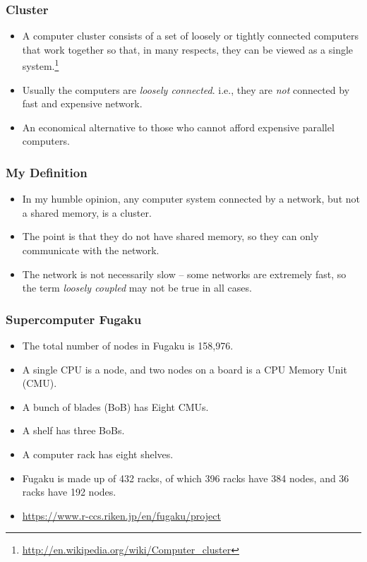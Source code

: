 \documentclass{beamer}
\begin{document}
\begin{CJK}{UTF8}{bsmi}
  \begin{frame}
    \frametitle{Cluster}
    \begin{itemize}
    \item A computer cluster consists of a set of loosely or tightly
      connected computers that work together so that, in many respects,
      they can be viewed as a single
      system.\footnote{\url{http://en.wikipedia.org/wiki/Computer_cluster}}
    \item Usually the computers are {\em loosely connected}. i.e., they
      are {\em not} connected by fast and expensive network.
    \item An economical alternative to those who cannot afford expensive
      parallel computers.
    \end{itemize}
  \end{frame}

  \begin{frame}
    \frametitle{My Definition}
    \begin{itemize}
    \item In my humble opinion, any computer system connected by a network, but not a shared memory, is a cluster.
    \item The point is that they do not have shared memory, so they can only communicate with the network.
    \item The network is not necessarily slow -- some networks are extremely fast, so the term {\em loosely coupled} may not be true in all cases.
    \end{itemize}
  \end{frame}

  \begin{frame}
    \frametitle{Supercomputer Fugaku}
    \begin{itemize}
    \item The total number of nodes in Fugaku is 158,976.
    \item A single CPU is a node, and two nodes on a board is a CPU Memory Unit (CMU).
    \item A bunch of blades (BoB) has Eight CMUs.
    \item A shelf has three BoBs.
    \item A computer rack has eight shelves.
    \item Fugaku is made up of 432 racks, of which 396 racks have 384 nodes, and 36 racks have 192 nodes.
    \item \url{https://www.r-ccs.riken.jp/en/fugaku/project}
    \end{itemize}
  \end{frame}


\end{CJK}
\end{document}
